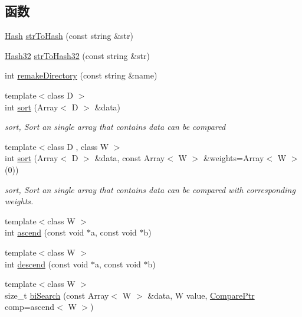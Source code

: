 \subsection*{函数}
\begin{DoxyCompactItemize}
\item 
\hyperlink{src_2utilities_2common_2basicFunction_8h_ae038e82942a65922bf0c621a284f0438}{Hash} \hyperlink{namespaceHSF_aedfe7e5a36d177f98a898f484caa0632}{strToHash} (const string \&str)
\item 
\hyperlink{src_2utilities_2common_2basicFunction_8h_a8a801999868ae4c7535a6422eaf4d67e}{Hash32} \hyperlink{namespaceHSF_ad68464331a75b6716258b105a8076144}{strToHash32} (const string \&str)
\item 
int \hyperlink{namespaceHSF_a421eadc73c19fbad2ebf9c62192d8733}{remakeDirectory} (const string \&name)
\item 
{\footnotesize template$<$class D $>$ }\\int \hyperlink{namespaceHSF_a6dc2998ec8bb64efa0517dde5f8ab74a}{sort} (Array$<$ D $>$ \&data)
\begin{DoxyCompactList}\small\item\em sort, Sort an single array that contains data can be compared \item\end{DoxyCompactList}\item 
{\footnotesize template$<$class D , class W $>$ }\\int \hyperlink{namespaceHSF_a31d056485ae50f601fdaa21322907005}{sort} (Array$<$ D $>$ \&data, const Array$<$ W $>$ \&weights=Array$<$ W $>$(0))
\begin{DoxyCompactList}\small\item\em sort, Sort an single array that contains data can be compared with corresponding weights. \item\end{DoxyCompactList}\item 
{\footnotesize template$<$class W $>$ }\\int \hyperlink{namespaceHSF_aecb490b70bec1ba6b46c17fcc4ffae89}{ascend} (const void $\ast$a, const void $\ast$b)
\item 
{\footnotesize template$<$class W $>$ }\\int \hyperlink{namespaceHSF_af2cc1f9a74df5f0056e658379f5af92e}{descend} (const void $\ast$a, const void $\ast$b)
\item 
{\footnotesize template$<$class W $>$ }\\size\_\-t \hyperlink{namespaceHSF_a177c9fa2598f6cba867c17cbcfd9c351}{biSearch} (const Array$<$ W $>$ \&data, W value, \hyperlink{namespaceHSF_ad5c260e0fc81004bced4ebf9662faf7f}{ComparePtr} comp=ascend$<$ W $>$)

\end{DoxyCompactItemize}
